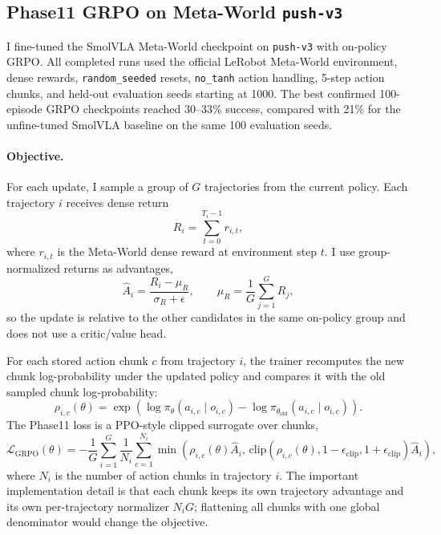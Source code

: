 
\subsection{Phase11 GRPO on Meta-World \texttt{push-v3}}
\label{sec:phase11-grpo-pushv3}

I fine-tuned the SmolVLA Meta-World checkpoint on \texttt{push-v3} with on-policy GRPO.  All completed runs used the official LeRobot Meta-World environment, dense rewards, \texttt{random\_seeded} resets, \texttt{no\_tanh} action handling, 5-step action chunks, and held-out evaluation seeds starting at 1000.  The best confirmed 100-episode GRPO checkpoints reached 30--33\% success, compared with 21\% for the unfine-tuned SmolVLA baseline on the same 100 evaluation seeds.

\paragraph{Objective.}
For each update, I sample a group of $G$ trajectories from the current policy.  Each trajectory $i$ receives dense return
\[
R_i = \sum_{t=0}^{T_i-1} r_{i,t},
\]
where $r_{i,t}$ is the Meta-World dense reward at environment step $t$.  I use group-normalized returns as advantages,
\[
\hat{A}_i = \frac{R_i - \mu_R}{\sigma_R + \epsilon},
\qquad
\mu_R = \frac{1}{G}\sum_{j=1}^{G}R_j,
\]
so the update is relative to the other candidates in the same on-policy group and does not use a critic/value head.

For each stored action chunk $c$ from trajectory $i$, the trainer recomputes the new chunk log-probability under the updated policy and compares it with the old sampled chunk log-probability:
\[
\rho_{i,c}(\theta) =
\exp\!\left(
\log \pi_{\theta}(a_{i,c}\mid o_{i,c})
- \log \pi_{\theta_{\mathrm{old}}}(a_{i,c}\mid o_{i,c})
\right).
\]
The Phase11 loss is a PPO-style clipped surrogate over chunks,
\[
\mathcal{L}_{\mathrm{GRPO}}(\theta)
=
-\frac{1}{G}\sum_{i=1}^{G}
\frac{1}{N_i}\sum_{c=1}^{N_i}
\min\!\left(
\rho_{i,c}(\theta)\hat{A}_i,\,
\mathrm{clip}(\rho_{i,c}(\theta), 1-\epsilon_{\mathrm{clip}}, 1+\epsilon_{\mathrm{clip}})\hat{A}_i
\right),
\]
where $N_i$ is the number of action chunks in trajectory $i$.  The important implementation detail is that each chunk keeps its own trajectory advantage and its own per-trajectory normalizer $N_iG$; flattening all chunks with one global denominator would change the objective.

